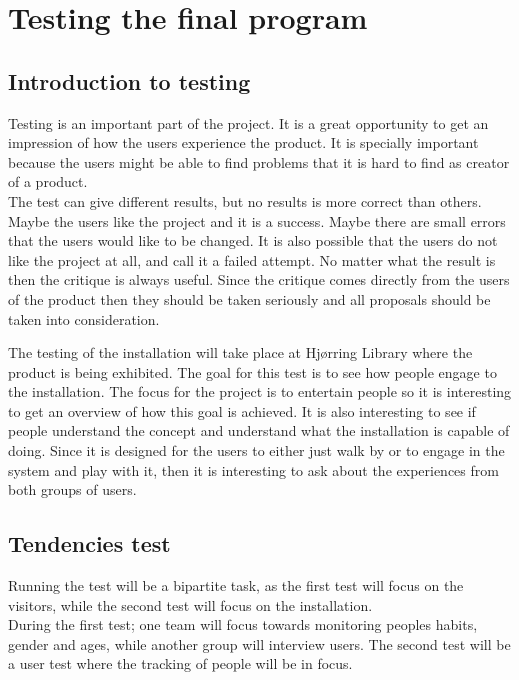 \chapter{Testing the final program}
\section{Introduction to testing}
Testing is an important part of the project. It is a great opportunity to get an impression of how the users experience the product. It is specially important because the users might be able to find problems that it is hard to find as creator of a product. \\
The test can give different results, but no results is more correct than others. Maybe the users like the project and it is a success. Maybe there are small errors that the users would like to be changed. It is also possible that the users do not like the project at all, and call it a failed attempt. No matter what the result is then the critique is always useful. Since the critique comes directly from the users of the product then they should be taken seriously and all proposals should be taken into consideration. 

The testing of the installation will take place at Hj{\o}rring Library where the product is being exhibited. The goal for this test is to see how people engage to the installation. The focus for the project is to entertain people so it is interesting to get an overview of how this goal is achieved. It is also interesting to see if people understand the concept and understand what the installation is capable of doing. Since it is designed for the users to either just walk by or to engage in the system and play with it, then it is interesting to ask about the experiences from both groups of users. \\ 

\section{Tendencies test}
Running the test will be a bipartite task, as the first test will focus on the visitors, while the second test will focus on the installation.\\
During the first test; one team will focus towards monitoring peoples habits, gender and ages, while another group will interview users. The second test will be a user test where the tracking of people will be in focus.

